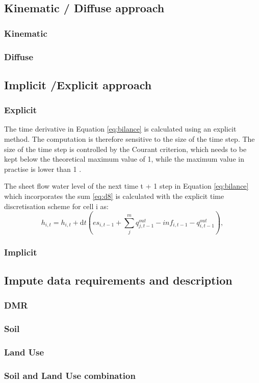  

    \subsection{Kinematic / Diffuse approach}

        \subsubsection{Kinematic}
        \subsubsection{Diffuse}

    \subsection{Implicit /Explicit approach}

        \subsubsection{Explicit}
            The time derivative in Equation \ref{eq:bilance} is calculated using an
            explicit method. The computation is therefore sensitive to the size of the time
            step. The size of the time step is controlled by the Courant criterion, which
            needs to be kept below the theoretical maximum value of 1, while the maximum
            value in practise is lower than 1 
            \cite{zhang1989modeling, esteves2000overland}.


            The sheet flow water level of the next time t + 1 step in Equation
            \ref{eq:bilance} which incorporates the sum \ref{eq:d8} is calculated with the
            explicit time discretisation scheme for cell i as:
            \begin{equation} 
            h_{i,t} =h_{i,t} + \mathrm{d}t (es_{i,t-1} + \sum_j^m q^{out}_{j,t-1}-
            inf_{i,t-1} - q^{out}_{i,t-1}),
            \label{eq:bilance}
            \end{equation}
        \subsubsection{Implicit}

    \subsection{Impute data requirements and description}

        
        \subsubsection{DMR}
        \subsubsection{Soil}
        \subsubsection{Land Use}
        \subsubsection{Soil and Land Use  combination}
